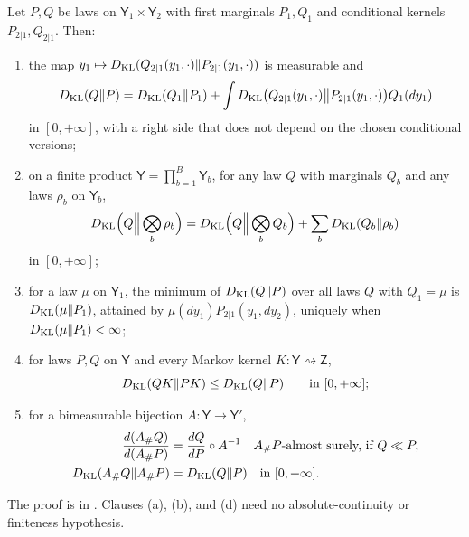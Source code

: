 Let $P,Q$ be laws on $\mathsf Y_1\times\mathsf Y_2$ with first marginals $P_1,Q_1$ and conditional kernels
$P_{2|1},Q_{2|1}$. Then:
\begin{enumerate}
\item[(a)] the map $y_1\mapsto D_{\mathrm{KL}}(Q_{2|1}(y_1,\cdot)\Vert P_{2|1}(y_1,\cdot))$ is measurable and
\begin{equation}
D_{\mathrm{KL}}(Q\Vert P)
=D_{\mathrm{KL}}(Q_1\Vert P_1)
+\int D_{\mathrm{KL}}\bigl(Q_{2|1}(y_1,\cdot)\big\Vert P_{2|1}(y_1,\cdot)\bigr)Q_1(dy_1)
\label{eq:elbo-kl-chain-rule}
\end{equation}
in $[0,+\infty]$, with a right side that does not depend on the chosen conditional versions;
\item[(b)] on a finite product $\mathsf Y=\prod_{b=1}^B\mathsf Y_b$, for any law $Q$ with marginals $Q_b$
and any laws $\rho_b$ on $\mathsf Y_b$,
\begin{equation}
D_{\mathrm{KL}}\Bigl(Q\Big\Vert\bigotimes_b\rho_b\Bigr)
=D_{\mathrm{KL}}\Bigl(Q\Big\Vert\bigotimes_bQ_b\Bigr)+\sum_bD_{\mathrm{KL}}(Q_b\Vert\rho_b)
\label{eq:prob-kl-product-reference}
\end{equation}
in $[0,+\infty]$;
\item[(c)] for a law $\mu$ on $\mathsf Y_1$, the minimum of $D_{\mathrm{KL}}(Q\Vert P)$ over all laws $Q$ with
$Q_1=\mu$ is $D_{\mathrm{KL}}(\mu\Vert P_1)$, attained by $\mu(dy_1)P_{2|1}(y_1,dy_2)$, uniquely when
$D_{\mathrm{KL}}(\mu\Vert P_1)<\infty$;
\item[(d)]\label{thm:cg-kl-dpi-extended} for laws $P,Q$ on $\mathsf Y$ and every Markov kernel
$K:\mathsf Y\rightsquigarrow\mathsf Z$,
\begin{equation}
D_{\mathrm{KL}}(QK\Vert PK)\leq D_{\mathrm{KL}}(Q\Vert P)
\qquad\text{in }[0,+\infty];
\label{eq:cg-kl-dpi-extended}
\end{equation}
\item[(e)] for a bimeasurable bijection $A:\mathsf Y\to\mathsf Y'$,
\begin{align}
\frac{d(A_\#Q)}{d(A_\#P)}&=\frac{dQ}{dP}\circ A^{-1}
\quad A_\#P\text{-almost surely, if }Q\ll P,
\label{eq:cg-rn-bimeasurable}\\
D_{\mathrm{KL}}(A_\#Q\Vert A_\#P)&=D_{\mathrm{KL}}(Q\Vert P)
\quad\text{in }[0,+\infty].
\label{eq:cg-kl-bimeasurable-invariance}
\end{align}
\end{enumerate}

The proof is in . Clauses (a), (b), and (d) need no absolute-continuity or
finiteness hypothesis.

